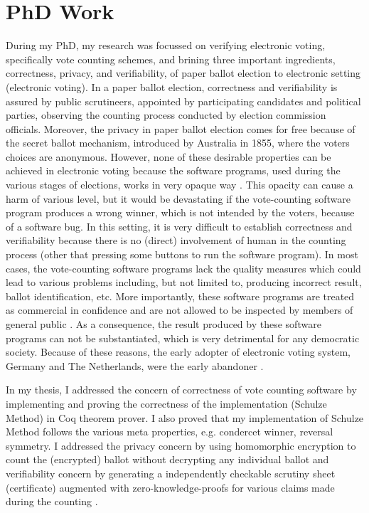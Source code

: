 \documentclass[a4paper]{article}
\begin{document}
\section{PhD Work}
During my PhD, my research was focussed on verifying electronic voting, specifically vote counting schemes, 
and brining three important ingredients, correctness, 
privacy, and verifiability, of paper ballot election to electronic setting (electronic voting). In a paper ballot election, correctness and verifiability is
assured by public scrutineers, appointed by participating candidates and political parties, observing the counting process conducted by 
election commission officials. Moreover, the privacy in paper ballot election comes for free because of the secret ballot mechanism, introduced 
by Australia in 1855, where the voters choices are anonymous. However, none of 
these desirable properties can be achieved in electronic voting because the software programs, used during the 
various stages of  elections, works in very opaque way \cite{Wolchok:2010:SAI:1866307.1866309, 10.1007/978-3-319-22270-7_3}.
 This opacity can cause a harm of various level, but 
it would be devastating if the vote-counting 
software program produces a wrong winner, which is not intended by the voters, because of a software bug. 
In this setting, it is very difficult to 
establish correctness and verifiability because there is no (direct) involvement of human in the counting process (other 
that pressing some buttons to run the software program).  
In most cases, the vote-counting software programs lack the quality measures which could lead to various 
problems including, but not limited to,  producing incorrect result, ballot identification, etc.  More importantly, these software programs
are treated as commercial in confidence and are not allowed to be inspected by members of general public \cite{AEC:2013:LMM}. 
As a consequence, the result produced by these software programs can not be substantiated, which is very detrimental 
for any democratic society. Because of these reasons, the early adopter of electronic 
voting system, Germany and The Netherlands, were the early abandoner \cite{Jacobs2009}. 

In my thesis, I addressed the concern of correctness of vote counting 
software by implementing  and proving the correctness of the implementation (Schulze Method) in Coq theorem prover. 
I also proved that my implementation of Schulze Method follows the various meta properties, e.g. condercet winner, reversal symmetry.
I addressed the privacy concern by using homomorphic encryption to count the (encrypted) ballot without decrypting 
any individual ballot and  verifiability concern by generating a independently checkable scrutiny sheet (certificate) 
augmented with zero-knowledge-proofs for various claims made during the counting \cite{10.1007/978-3-030-41600-3_4, 10.1145/3319535.3354247}. 
\end{document}
